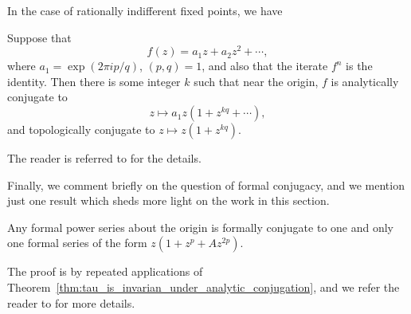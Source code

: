 In the case of rationally indifferent fixed points, we have

\begin{theorem}
    Suppose that
    \begin{equation*}
        f(z) = a_1 z + a_2 z^2 + \cdots,
    \end{equation*}
    where $a_1 = \exp(2\pi i p / q)$, $(p, q) = 1$, and also that the iterate
    $f^n$ is the identity. Then there is some integer $k$ such that near the
    origin, $f$ is analytically conjugate to
    \begin{equation*}
        z \mapsto a_1 z (1 + z^{kq} + \cdots),
    \end{equation*}
    and topologically conjugate to $z \mapsto z(1 + z^{kq})$.
\end{theorem}

The reader is referred to \cite{Camacho1978} for the details.

Finally, we comment briefly on the question of formal conjugacy, and we mention
just one result which sheds more light on the work in this section.

\begin{theorem}
    Any formal power series about the origin is formally conjugate to one and
    only one formal series of the form $z(1 + z^p + A z^{2p})$.
\end{theorem}

The proof is by repeated applications of
Theorem~\ref{thm:tau_is_invarian_under_analytic_conjugation}, and we refer the
reader to \cite{Voronin1981} for more details.
